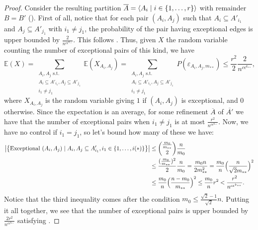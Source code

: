 \begin{lemma}
\begin{proof}
                Consider the resulting partition $\overline{A} = \left< A_i \mid i \in \{ 1, \dots, r \} \right>$ with remainder $B = B'$
                ().
                First of all, notice that for each pair $(A_i, A_j)$ such that $A_i \subseteq A'_{i_1}$ and
                $A_j \subseteq A'_{j_1}$ with $i_1 \neq j_1$, the probability of the pair having exceptional edges is
                upper bounded by $\frac{2}{n^{c\epsilon^{k_{**}}}}$.
                This follows .
                Thus, given $X$ the random variable counting the number of exceptional pairs of this kind, we have
                \[
                    \mathbb{E}(X) = \sum_{\substack{A_i,A_j \text{ s.t.}\\A_i\subseteq A'_{i_1},A_j\subseteq A'_{j_1}\\i_1\neq j_1}} \mathbb{E}(X_{A_i, A_j})
                         = \sum_{\substack{A_i,A_j \text{ s.t.}\\A_i\subseteq A'_{i_1},A_j\subseteq A'_{j_1}\\i_1\neq j_1}} P(\varepsilon_{A_i, A_j,m_{**}})
                         \leq \frac{r^2}{2} \frac{2}{n^{c\epsilon^{k_{**}}}},
                \]
                where $X_{A_i,A_j}$ is the random variable giving $1$ if $(A_i, A_j)$ is exceptional, and $0$ otherwise.
                Since the expectation is an average, for some refinement $\overline{A}$ of $\overline{A'}$ we have that
                the number of exceptional pairs when $i_1 \neq j_1$ is at most $\frac{r^2}{n^{c\epsilon^{k_{**}}}}$.
                Now, we have no control if $i_1 = j_1$, so let's bound how many of these we have:
                \[
                    \begin{split}
                        \bigl| \bigl\{ \text{Exceptional } (A_i, A_j) \mid A_i, A_j \subseteq A'_{i_1}, i_1 \in \{ 1, \dots, i(*) \} \bigr\} \bigr|
                            & \leq {\frac{m_0}{m_{**}} \choose 2} \frac{n}{m_0} \\
                            & \leq \frac{( \frac{m_0}{m_{**}} )^2}{2} \frac{n}{m_0}
                                = \frac{m_0 n}{2 m_{**}^2}
                                = \frac{m_0}{n} \Bigl( \frac{n}{\sqrt{2}m_{**}} \Bigr)^2 \\
                            & \leq \frac{m_0}{n} \Bigl( \frac{n - m_0}{m_{**}} \Bigr)^2
                                \leq \frac{m_0}{n} r^2
                                < \frac{r^2}{n^{c \epsilon^{k_{**}}}}.
                    \end{split}
                \]
                Notice that the third inequality comes after the condition $m_0 \leq \frac{\sqrt{2}-1}{\sqrt{2}} n$.
                Putting it all together, we see that the number of exceptional pairs is upper bounded by
                    $\frac{2r^2}{n^{c\epsilon^{k_{**}}}}$ satisfying .
            \end{proof}
        \end{lemma}

